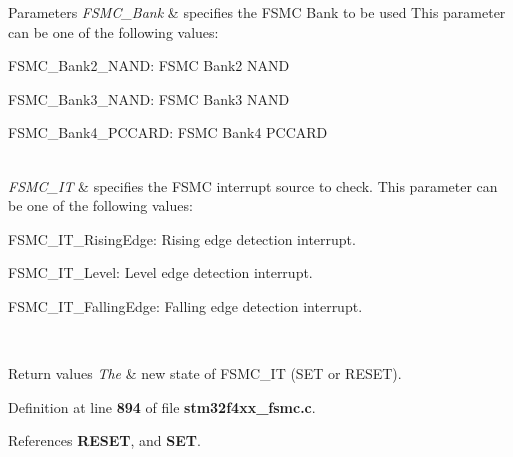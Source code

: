 \begin{DoxyParams}{Parameters}
{\em F\+S\+M\+C\+\_\+\+Bank} & specifies the F\+S\+MC Bank to be used This parameter can be one of the following values\+: \begin{DoxyItemize}
\item F\+S\+M\+C\+\_\+\+Bank2\+\_\+\+N\+A\+ND\+: F\+S\+MC Bank2 N\+A\+ND \item F\+S\+M\+C\+\_\+\+Bank3\+\_\+\+N\+A\+ND\+: F\+S\+MC Bank3 N\+A\+ND \item F\+S\+M\+C\+\_\+\+Bank4\+\_\+\+P\+C\+C\+A\+RD\+: F\+S\+MC Bank4 P\+C\+C\+A\+RD \end{DoxyItemize}
\\
\hline
{\em F\+S\+M\+C\+\_\+\+IT} & specifies the F\+S\+MC interrupt source to check. This parameter can be one of the following values\+: \begin{DoxyItemize}
\item F\+S\+M\+C\+\_\+\+I\+T\+\_\+\+Rising\+Edge\+: Rising edge detection interrupt. \item F\+S\+M\+C\+\_\+\+I\+T\+\_\+\+Level\+: Level edge detection interrupt. \item F\+S\+M\+C\+\_\+\+I\+T\+\_\+\+Falling\+Edge\+: Falling edge detection interrupt. \end{DoxyItemize}
\\
\hline
\end{DoxyParams}

\begin{DoxyRetVals}{Return values}
{\em The} & new state of F\+S\+M\+C\+\_\+\+IT (S\+ET or R\+E\+S\+ET). \\
\hline
\end{DoxyRetVals}


Definition at line \textbf{ 894} of file \textbf{ stm32f4xx\+\_\+fsmc.\+c}.



References \textbf{ R\+E\+S\+ET}, and \textbf{ S\+ET}.



